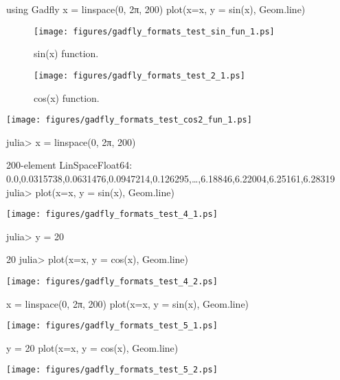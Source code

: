 

\begin{juliacode}
using Gadfly
x = linspace(0, 2π, 200)
plot(x=x, y = sin(x), Geom.line)
\end{juliacode}
\begin{figure}[ht]
\center
\texttt{[image: figures/gadfly\_formats\_test\_sin\_fun\_1.ps]}
\caption{sin(x) function.}
\label{fig:sin_fun}
\end{figure}



\begin{figure}[htpb]
\center
\texttt{[image: figures/gadfly\_formats\_test\_2\_1.ps]}
\caption{cos(x) function.}
\end{figure}



\texttt{[image: figures/gadfly\_formats\_test\_cos2\_fun\_1.ps]}



\begin{juliaterm}
julia> x = linspace(0, 2π, 200)

200-element LinSpace{Float64}:
 0.0,0.0315738,0.0631476,0.0947214,0.126295,…,6.18846,6.22004,6.25161,6.28319
julia> plot(x=x, y = sin(x), Geom.line)

\end{juliaterm}
\texttt{[image: figures/gadfly\_formats\_test\_4\_1.ps]}

\begin{juliaterm}
julia> y = 20

20
julia> plot(x=x, y = cos(x), Geom.line)
\end{juliaterm}
\texttt{[image: figures/gadfly\_formats\_test\_4\_2.ps]}



\begin{juliacode}
x = linspace(0, 2π, 200)
plot(x=x, y = sin(x), Geom.line)

\end{juliacode}
\texttt{[image: figures/gadfly\_formats\_test\_5\_1.ps]}

\begin{juliacode}
y = 20
plot(x=x, y = cos(x), Geom.line)
\end{juliacode}
\texttt{[image: figures/gadfly\_formats\_test\_5\_2.ps]}
